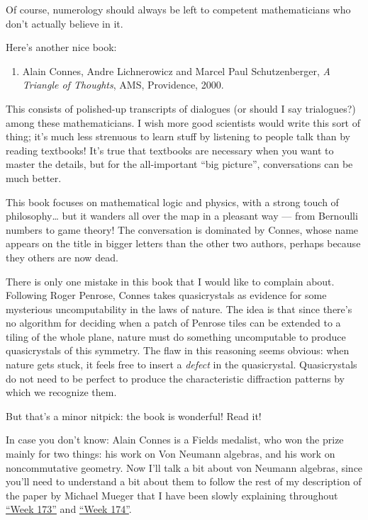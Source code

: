 \documentclass{article}
\def\tightlist{}
\begin{document}
Of course, numerology should always be left to competent mathematicians
who don't actually believe in it.

Here's another nice book:

\begin{enumerate}
\def\labelenumi{\arabic{enumi})}
\setcounter{enumi}{3}
\tightlist
\item
  Alain Connes, Andre Lichnerowicz and Marcel Paul Schutzenberger,
  \emph{A Triangle of Thoughts}, AMS, Providence, 2000.
\end{enumerate}

This consists of polished-up transcripts of dialogues (or should I say
trialogues?) among these mathematicians. I wish more good scientists
would write this sort of thing; it's much less strenuous to learn stuff
by listening to people talk than by reading textbooks! It's true that
textbooks are necessary when you want to master the details, but for the
all-important ``big picture'', conversations can be much better.

This book focuses on mathematical logic and physics, with a strong touch
of philosophy\ldots{} but it wanders all over the map in a pleasant way
--- from Bernoulli numbers to game theory! The conversation is dominated
by Connes, whose name appears on the title in bigger letters than the
other two authors, perhaps because they others are now dead.

There is only one mistake in this book that I would like to complain
about. Following Roger Penrose, Connes takes quasicrystals as evidence
for some mysterious uncomputability in the laws of nature. The idea is
that since there's no algorithm for deciding when a patch of Penrose
tiles can be extended to a tiling of the whole plane, nature must do
something uncomputable to produce quasicrystals of this symmetry. The
flaw in this reasoning seems obvious: when nature gets stuck, it feels
free to insert a \emph{defect} in the quasicrystal. Quasicrystals do not
need to be perfect to produce the characteristic diffraction patterns by
which we recognize them.

But that's a minor nitpick: the book is wonderful! Read it!

In case you don't know: Alain Connes is a Fields medalist, who won the
prize mainly for two things: his work on Von Neumann algebras, and his
work on noncommutative geometry. Now I'll talk a bit about von Neumann
algebras, since you'll need to understand a bit about them to follow the
rest of my description of the paper by Michael Mueger that I have been
slowly explaining throughout \protect\hyperlink{week173}{``Week 173''}
and \protect\hyperlink{week174}{``Week 174''}.
\end{document}
